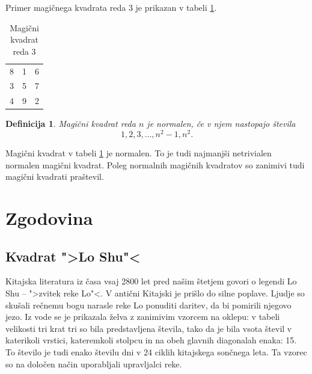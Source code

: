 \documentclass[a4paper,12pt]{article}
\newtheorem{definicija}[izrek]{Definicija}
\newcommand{\pojem}[1]{\emph{}{\color{purple}#1}}
\begin{document}
Primer magičnega kvadrata reda 3 je prikazan v tabeli \ref{table:mag3}.


\begin{table}
   \centering
   \caption{Magični kvadrat reda 3}
   \label{table:mag3}
   \begin{tabular}{ccc} \toprule
        8 & 1 & 6 \\
        3 & 5 & 7 \\
        4 & 9 & 2 \\ \bottomrule
   \end{tabular}
\end{table}

\begin{definicija}
   Magični kvadrat reda $n$ je \pojem{normalen}, če v njem nastopajo števila
   \begin{equation}
      \label{eq:numbers}
      1, 2, 3, \ldots, n^2-1, n^2.
   \end{equation}
\end{definicija}

Magični kvadrat v tabeli \ref{table:mag3} je normalen.
To je tudi najmanjši netrivialen normalen magični kvadrat.
Poleg normalnih magičnih kvadratov so zanimivi tudi magični kvadrati praštevil.


\section{Zgodovina}

\subsection{Kvadrat ">Lo Shu"<}

Kitajska literatura iz časa vsaj 2800 let pred našim štetjem govori o legendi
\pojem{Lo Shu} -- ">zvitek reke Lo"<. V antični Kitajski je prišlo do
silne poplave. Ljudje so skušali rečnemu bogu narasle reke Lo ponuditi daritev,
da bi pomirili njegovo jezo. Iz vode se je prikazala želva z zanimivim vzorcem
na oklepu: v tabeli velikosti tri krat tri so bila predstavljena števila, tako
da je bila vsota števil v katerikoli vrstici, kateremkoli stolpcu in na obeh
glavnih diagonalah enaka: 15. To število je tudi enako številu dni v 24 ciklih
kitajskega sončnega leta. Ta vzorec so na določen način uporabljali upravljalci
reke.
\end{document}
